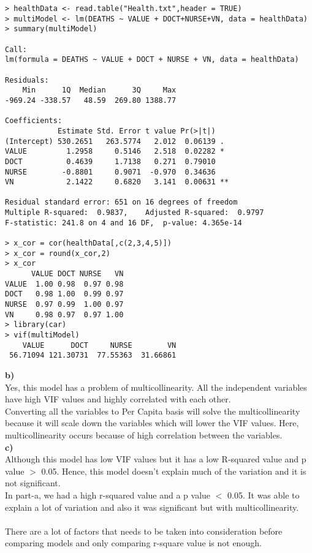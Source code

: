 \documentclass[12pt,letterpaper]{article}
\begin{document}
\begin{lstlisting}[label=R Code,caption=Q5(a) R Code Output]
> healthData <- read.table("Health.txt",header = TRUE)
> multiModel <- lm(DEATHS ~ VALUE + DOCT+NURSE+VN, data = healthData)
> summary(multiModel)

Call:
lm(formula = DEATHS ~ VALUE + DOCT + NURSE + VN, data = healthData)

Residuals:
    Min      1Q  Median      3Q     Max 
-969.24 -338.57   48.59  269.80 1388.77 

Coefficients:
            Estimate Std. Error t value Pr(>|t|)   
(Intercept) 530.2651   263.5774   2.012  0.06139 . 
VALUE         1.2958     0.5146   2.518  0.02282 * 
DOCT          0.4639     1.7138   0.271  0.79010   
NURSE        -0.8801     0.9071  -0.970  0.34636   
VN            2.1422     0.6820   3.141  0.00631 **

Residual standard error: 651 on 16 degrees of freedom
Multiple R-squared:  0.9837,	Adjusted R-squared:  0.9797 
F-statistic: 241.8 on 4 and 16 DF,  p-value: 4.365e-14

> x_cor = cor(healthData[,c(2,3,4,5)])
> x_cor = round(x_cor,2)
> x_cor
      VALUE DOCT NURSE   VN
VALUE  1.00 0.98  0.97 0.98
DOCT   0.98 1.00  0.99 0.97
NURSE  0.97 0.99  1.00 0.97
VN     0.98 0.97  0.97 1.00
> library(car)
> vif(multiModel)
    VALUE      DOCT     NURSE        VN 
 56.71094 121.30731  77.55363  31.66861 
\end{lstlisting}

\textbf{{b)}}\\
Yes, this model has a problem of  multicollinearity. All the independent variables have high VIF values and highly correlated with each other. \\
Converting all the variables to Per Capita basis will solve the multicollinearity because it will scale down the variables which will lower the VIF values.  Here, multicollinearity occurs because of high correlation between the variables. 
\\
\textbf{{c)} }\\
Although this model has low VIF values but it has a low R-squared value and p value $>$ 0.05. Hence, this model doesn't explain much of the variation and it is not significant. \\
In part-a, we had a high r-squared value and a p value $<$ 0.05. It was able to explain a lot of variation and also it was significant but with multicollinearity.\\
\\
There are a lot of factors that needs to be taken into consideration before comparing models and only comparing r-square value is not enough. 
\end{document}
